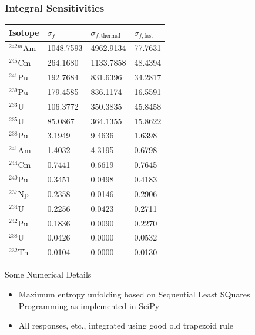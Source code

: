 \documentclass[fleqn]{beamer}
\begin{document}
    \begin{frame}
       \frametitle{Integral Sensitivities}
    
    \small
        \begin{table}
            \begin{tabular}{llll}
                \toprule
                Isotope & $\sigma_f$ & $\sigma_{f,\text{thermal}}$ & $\sigma_{f, \text{fast}}$ \\ 
                \hline
 ${}^{242m}$Am & 1048.7593 &  4962.9134 &  77.7631\\
 ${}^{245}$Cm & 264.1680 &  1133.7858 &  48.4394\\
 \hline
 ${}^{241}$Pu & 192.7684 &  831.6396 &  34.2817\\
 ${}^{239}$Pu & 179.4585 &  836.1174 &  16.5591\\
 ${}^{233}$U & 106.3772 &  350.3835 &  45.8458\\
 ${}^{235}$U & 85.0867 &  364.1355 &  15.8622\\
 \hline
 ${}^{238}$Pu & 3.1949 &  9.4636 &  1.6398\\
 ${}^{241}$Am & 1.4032 &  4.3195 &  0.6798\\
 ${}^{244}$Cm & 0.7441 &  0.6619 &  0.7645\\
 \hline
 ${}^{240}$Pu & 0.3451 &  0.0498 &  0.4183\\
 ${}^{237}$Np & 0.2358 &  0.0146 &  0.2906\\
 ${}^{234}$U & 0.2256 &  0.0423 &  0.2711\\
 ${}^{242}$Pu & 0.1836 &  0.0090 &  0.2270\\
 \hline
 ${}^{238}$U & 0.0426 &  0.0000 &  0.0532\\
 ${}^{232}$Th & 0.0104 &  0.0000 &  0.0130\\
                \bottomrule
            \end{tabular}
        \end{table}
        
    \end{frame}
    
    \begin{frame}{Some Numerical Details}
     \begin{itemize}
      \item Maximum entropy unfolding based on Sequential Least SQuares Programming
            as implemented in SciPy
      \item All responses, etc., integrated using good old trapezoid rule 
     \end{itemize}

    \end{frame}
\end{document}
